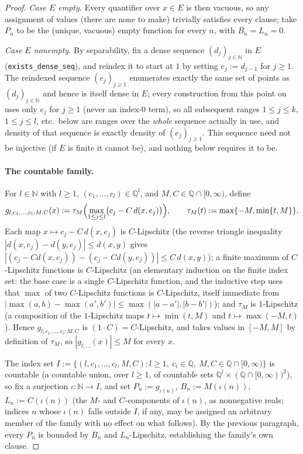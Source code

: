 \begin{proof}
  \emph{Case $E$ empty.} Every quantifier over $x \in E$ is then vacuous, so any assignment of
  values (there are none to make) trivially satisfies every clause; take $P_n$ to be the (unique,
  vacuous) empty function for every $n$, with $B_n = L_n = 0$.

  \emph{Case $E$ nonempty.} By separability, fix a dense sequence $(d_j)_{j \in \mathbb{N}}$ in $E$
  (\texttt{exists\_dense\_seq}), and reindex it to start at $1$ by setting $e_j := d_{j-1}$ for $j
  \ge 1$. The reindexed sequence $(e_j)_{j \ge 1}$ enumerates exactly the same set of points as
  $(d_j)_{j \in \mathbb{N}}$ and hence is itself dense in $E$; every construction from this point
  on uses only $e_j$ for $j \ge 1$ (never an index-$0$ term), so all subsequent ranges $1 \le j \le
  k$, $1 \le j \le l$, etc.\ below are ranges over the \emph{whole} sequence actually in use, and
  density of that sequence is exactly density of $(e_j)_{j \ge 1}$. This sequence need not be
  injective (if $E$ is finite it cannot be), and nothing below requires it to be.

  \paragraph{The countable family.} For $l \in \mathbb{N}$ with $l \ge 1$, $(c_1,\dots,c_l) \in
  \mathbb{Q}^l$, and $M, C \in \mathbb{Q} \cap [0,\infty)$, define
  \[
    g_{l;c_1,\dots,c_l;M,C}(x) := \tau_M\Bigl(\max_{1 \le j \le l} \bigl(c_j - C\,d(x,e_j)\bigr)\Bigr)
    , \qquad \tau_M(t) := \max\{-M,\min\{t,M\}\}
    .
  \]
  Each map $x \mapsto c_j - C\,d(x,e_j)$ is $C$-Lipschitz (the reverse triangle inequality
  $|d(x,e_j)-d(y,e_j)| \le d(x,y)$ gives $|(c_j-Cd(x,e_j))-(c_j-Cd(y,e_j))| \le C\,d(x,y)$); a
  finite maximum of $C$-Lipschitz functions is $C$-Lipschitz (an elementary induction on the finite
  index set: the base case is a single $C$-Lipschitz function, and the inductive step uses that
  $\max$ of two $C$-Lipschitz functions is $C$-Lipschitz, itself immediate from
  $|\max(a,b)-\max(a',b')| \le \max(|a-a'|,|b-b'|)$); and $\tau_M$ is $1$-Lipschitz (a composition
  of the $1$-Lipschitz maps $t \mapsto \min(t,M)$ and $t \mapsto \max(-M,t)$). Hence
  $g_{l;c_1,\dots,c_l;M,C}$ is $(1 \cdot C) = C$-Lipschitz, and takes values in $[-M,M]$ by
  definition of $\tau_M$, so $|g_{l;\dots}(x)| \le M$ for every $x$.

  The index set $I := \{(l,c_1,\dots,c_l,M,C) : l \ge 1,\ c_i \in \mathbb{Q},\ M,C \in \mathbb{Q}
  \cap [0,\infty)\}$ is countable (a countable union, over $l \ge 1$, of countable sets
  $\mathbb{Q}^l \times (\mathbb{Q}\cap[0,\infty))^2$), so fix a surjection $\iota \colon \mathbb{N}
  \to I$, and set $P_n := g_{\iota(n)}$, $B_n := M(\iota(n))$, $L_n := C(\iota(n))$ (the $M$- and
  $C$-components of $\iota(n)$, as nonnegative reals; indices $n$ whose $\iota(n)$ falls outside
  $I$, if any, may be assigned an arbitrary member of the family with no effect on what follows).
  By the previous paragraph, every $P_n$ is bounded by $B_n$ and $L_n$-Lipschitz, establishing the
  family's own clause.


\end{proof}
